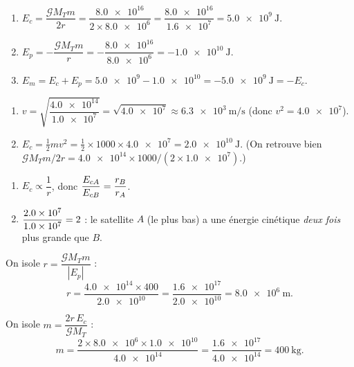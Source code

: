 \documentclass[11pt,a4paper]{article}
\begin{document}

\begin{corrige}
\begin{enumerate}[label=\alph*)]
  \item $E_c=\dfrac{\mathcal{G}M_T m}{2r}=\dfrac{\num{8.0e16}}{2\times\num{8.0e6}}
        =\dfrac{\num{8.0e16}}{\num{1.6e7}}=\qty{5.0e9}{\joule}$.
  \item $E_p=-\dfrac{\mathcal{G}M_T m}{r}=-\dfrac{\num{8.0e16}}{\num{8.0e6}}
        =-\qty{1.0e10}{\joule}$.
  \item $E_m=E_c+E_p=\num{5.0e9}-\num{1.0e10}=-\qty{5.0e9}{\joule}=-E_c$. \checkmark
\end{enumerate}
\end{corrige}

\begin{corrige}
\begin{enumerate}[label=\alph*)]
  \item $v=\sqrt{\dfrac{\num{4.0e14}}{\num{1.0e7}}}=\sqrt{\num{4.0e7}}
        \approx\qty{6.3e3}{\metre\per\second}$ (donc $v^2=\num{4.0e7}$).
  \item $E_c=\tfrac12 m v^2=\tfrac12\times 1000\times\num{4.0e7}=\qty{2.0e10}{\joule}$.
        (On retrouve bien $\mathcal{G}M_T m/2r=\num{4.0e14}\times 1000/(2\times\num{1.0e7})$.)
\end{enumerate}
\end{corrige}

\begin{corrige}
\begin{enumerate}[label=\alph*)]
  \item $E_c\propto\dfrac1r$, donc $\displaystyle \frac{E_{cA}}{E_{cB}}=\frac{r_B}{r_A}$.
  \item $\displaystyle \frac{\num{2.0e7}}{\num{1.0e7}}=2$ : le satellite $A$ (le plus bas) a une
        énergie cinétique \emph{deux fois} plus grande que $B$.
\end{enumerate}
\end{corrige}

\begin{corrige}
On isole $r=\dfrac{\mathcal{G}M_T m}{|E_p|}$ :
\[
r=\frac{\num{4.0e14}\times 400}{\num{2.0e10}}=\frac{\num{1.6e17}}{\num{2.0e10}}
 =\qty{8.0e6}{\metre}.
\]
\end{corrige}

\begin{corrige}
On isole $m=\dfrac{2r\,E_c}{\mathcal{G}M_T}$ :
\[
m=\frac{2\times\num{8.0e6}\times\num{1.0e10}}{\num{4.0e14}}
 =\frac{\num{1.6e17}}{\num{4.0e14}}=\qty{400}{\kilogram}.
\]
\end{corrige}
\end{document}
